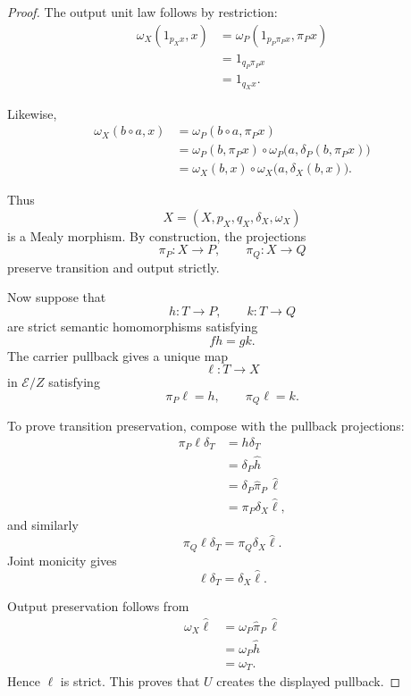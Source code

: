 \begin{proof}
    The output unit law follows by restriction:
    \[
    \begin{aligned}
        \omega_X(1_{p_Xx},x)
        &=
        \omega_P(1_{p_P\pi_Px},\pi_Px)
        \\
        &=
        1_{q_P\pi_Px}
        \\
        &=
        1_{q_Xx}.
    \end{aligned}
    \]

    Likewise,
    \[
    \begin{aligned}
        \omega_X(b\circ a,x)
        &=
        \omega_P(b\circ a,\pi_Px)
        \\
        &=
        \omega_P(b,\pi_Px)
        \circ
        \omega_P
        \bigl(
            a,
            \delta_P(b,\pi_Px)
        \bigr)
        \\
        &=
        \omega_X(b,x)
        \circ
        \omega_X
        \bigl(
            a,
            \delta_X(b,x)
        \bigr).
    \end{aligned}
    \]

    Thus
    \[
        X=(X,p_X,q_X,\delta_X,\omega_X)
    \]
    is a Mealy morphism. By construction, the projections
    \[
        \pi_P:X\to P,
        \qquad
        \pi_Q:X\to Q
    \]
    preserve transition and output strictly.

    Now suppose that
    \[
        h:T\to P,
        \qquad
        k:T\to Q
    \]
    are strict semantic homomorphisms satisfying
    \[
        fh=gk.
    \]
    The carrier pullback gives a unique map
    \[
        \ell:T\to X
    \]
    in \(\mathcal E/Z\) satisfying
    \[
        \pi_P\ell=h,
        \qquad
        \pi_Q\ell=k.
    \]

    To prove transition preservation, compose with the pullback projections:
    \[
    \begin{aligned}
        \pi_P\ell\delta_T
        &=
        h\delta_T
        \\
        &=
        \delta_P\widehat h
        \\
        &=
        \delta_P\widehat\pi_P\,\widehat\ell
        \\
        &=
        \pi_P\delta_X\widehat\ell,
    \end{aligned}
    \]
    and similarly
    \[
        \pi_Q\ell\delta_T
        =
        \pi_Q\delta_X\widehat\ell.
    \]
    Joint monicity gives
    \[
        \ell\delta_T
        =
        \delta_X\widehat\ell.
    \]

    Output preservation follows from
    \[
    \begin{aligned}
        \omega_X\widehat\ell
        &=
        \omega_P\widehat\pi_P\,\widehat\ell
        \\
        &=
        \omega_P\widehat h
        \\
        &=
        \omega_T.
    \end{aligned}
    \]
    Hence \(\ell\) is strict. This proves that \(U\) creates the displayed
    pullback.


\end{proof}
